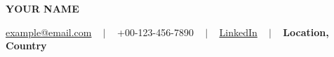 \begin{center}
	\textbf{\LARGE YOUR NAME}
\end{center}
\vspace{-0.2cm}
\begin{center}
	\href{mailto:example@email.com}{example@email.com} ~ $ | $ ~ +00-123-456-7890 ~ $ | $  ~ \href{https://www.linkedin.com/in/yourid/}{LinkedIn} ~ $ | $ ~ \textbf{Location, Country}
\end{center}
\vspace{-0.5cm}